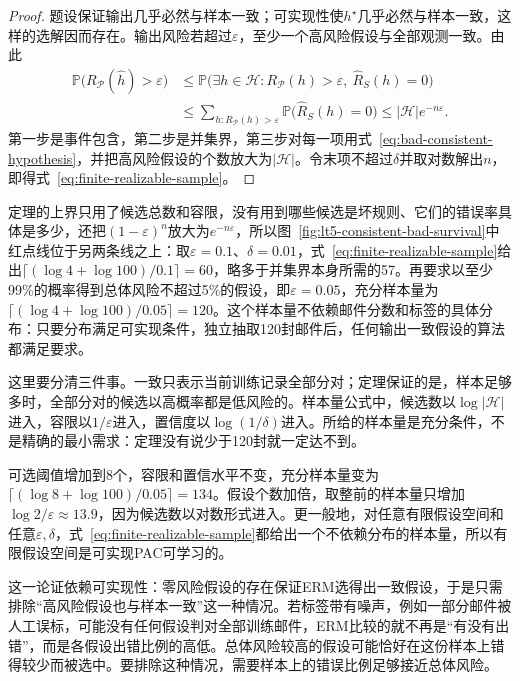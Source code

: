 \begin{proof}
题设保证输出几乎必然与样本一致；可实现性使$h^\star$几乎必然与样本一致，这样的选解因而存在。输出风险若超过$\varepsilon$，至少一个高风险假设与全部观测一致。由此
\begin{align*}
 \mathbb P\bigl(R_{\mathcal P}(\hat h)>\varepsilon\bigr)
 &\leq \mathbb P\bigl(\exists h\in\mathcal H:
       R_{\mathcal P}(h)>\varepsilon,\ \hat R_S(h)=0\bigr)\\
 &\leq\sum_{h:R_{\mathcal P}(h)>\varepsilon}
       \mathbb P\bigl(\hat R_S(h)=0\bigr)
 \leq |\mathcal H|e^{-n\varepsilon}.
\end{align*}
第一步是事件包含，第二步是并集界，第三步对每一项用式~\eqref{eq:bad-consistent-hypothesis}，并把高风险假设的个数放大为$|\mathcal H|$。令末项不超过$\delta$并取对数解出$n$，即得式~\eqref{eq:finite-realizable-sample}。
\end{proof}

定理的上界只用了候选总数和容限，没有用到哪些候选是坏规则、它们的错误率具体是多少，还把$(1-\varepsilon)^n$放大为$e^{-n\varepsilon}$，所以图~\ref{fig:lt5-consistent-bad-survival}中红点线位于另两条线之上：取$\varepsilon=0.1$、$\delta=0.01$，式~\eqref{eq:finite-realizable-sample}给出$\lceil(\log4+\log100)/0.1\rceil=60$，略多于并集界本身所需的57。再要求以至少99\%的概率得到总体风险不超过5\%的假设，即$\varepsilon=0.05$，充分样本量为$\lceil(\log4+\log100)/0.05\rceil=120$。这个样本量不依赖邮件分数和标签的具体分布：只要分布满足可实现条件，独立抽取120封邮件后，任何输出一致假设的算法都满足要求。

这里要分清三件事。一致只表示当前训练记录全部分对；定理保证的是，样本足够多时，全部分对的候选以高概率都是低风险的。样本量公式中，候选数以$\log|\mathcal H|$进入，容限以$1/\varepsilon$进入，置信度以$\log(1/\delta)$进入。所给的样本量是充分条件，不是精确的最小需求：定理没有说少于120封就一定达不到。

可选阈值增加到8个，容限和置信水平不变，充分样本量变为$\lceil(\log8+\log100)/0.05\rceil=134$。假设个数加倍，取整前的样本量只增加$\log2/\varepsilon\approx13.9$，因为候选数以对数形式进入。更一般地，对任意有限假设空间和任意$\varepsilon,\delta$，式~\eqref{eq:finite-realizable-sample}都给出一个不依赖分布的样本量，所以有限假设空间是可实现PAC可学习的。

这一论证依赖可实现性：零风险假设的存在保证ERM选得出一致假设，于是只需排除“高风险假设也与样本一致”这一种情况。若标签带有噪声，例如一部分邮件被人工误标，可能没有任何假设判对全部训练邮件，ERM比较的就不再是“有没有出错”，而是各假设出错比例的高低。总体风险较高的假设可能恰好在这份样本上错得较少而被选中。要排除这种情况，需要样本上的错误比例足够接近总体风险。

